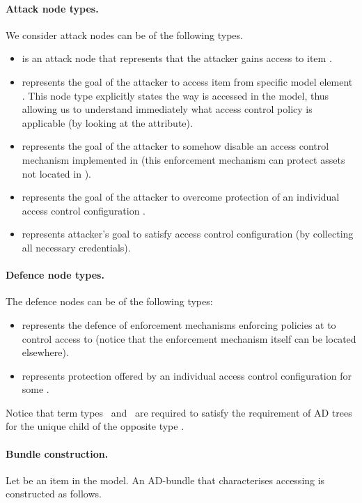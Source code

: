 \documentclass{llncs}
\begin{document}
\paragraph{Attack node types.}
We consider attack nodes can be of the following types. 
\begin{itemize}
\item \taccess is an attack node that represents that the attacker gains access to item . 
\item \taccfrom represents the goal of the attacker to access item  from specific model element . This node type explicitly states the way  is accessed in the model, thus allowing us to understand immediately what access control policy is applicable (by looking at the  attribute). 
\item \tbreak represents the goal of the attacker to somehow disable an access control mechanism implemented in  (this enforcement mechanism can protect assets not located in ).
\item \tbreakpol represents the goal of the attacker to overcome protection of an individual access control configuration .
\item \tsatpol represents attacker's goal to satisfy access control configuration  (by collecting all necessary credentials).

\end{itemize}



\paragraph{Defence node types.}
The defence nodes can be of the following types:
\begin{itemize}
\item \tdefence represents the defence of enforcement mechanisms enforcing policies at  to control access to  (notice that the enforcement mechanism itself can be located elsewhere).
\item  \tdefpolicy represents protection offered by an individual access control configuration for some . 
\end{itemize}
Notice that term types \tbreakpol\ and \tdefpolicy\ are required to satisfy the requirement of AD trees for the unique child of the opposite type \cite{Kordy-JLC-2014}. 

\paragraph{Bundle construction.}
Let  be an item in the model. An AD-bundle \baccess that characterises accessing  is constructed as follows.
\end{document}

